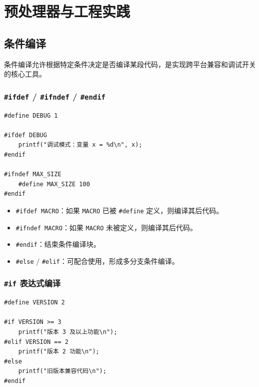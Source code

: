 \clearpage
\begingroup
\let\clearpage\relax
\let\cleardoublepage\relax
\vspace*{\fill}
\chapter{预处理器与工程实践}
\vspace*{\fill}
\endgroup
\clearpage


\section{条件编译}

条件编译允许根据特定条件决定是否编译某段代码，是实现跨平台兼容和调试开关的核心工具。

\subsection{\texorpdfstring{\texttt{\#ifdef} / \texttt{\#ifndef} / \texttt{\#endif}}{\#ifdef / \#ifndef / \#endif}}

\begin{lstlisting}[caption={条件编译基本用法}]
#define DEBUG 1

#ifdef DEBUG
    printf("调试模式：变量 x = %d\n", x);
#endif

#ifndef MAX_SIZE
    #define MAX_SIZE 100
#endif
\end{lstlisting}

\begin{itemize}
    \item \texttt{\#ifdef MACRO}：如果 \texttt{MACRO} 已被 \texttt{\#define} 定义，则编译其后代码。
    \item \texttt{\#ifndef MACRO}：如果 \texttt{MACRO} 未被定义，则编译其后代码。
    \item \texttt{\#endif}：结束条件编译块。
    \item \texttt{\#else} / \texttt{\#elif}：可配合使用，形成多分支条件编译。
\end{itemize}

\subsection{\texorpdfstring{\texttt{\#if} 表达式编译}{\#if 表达式编译}}

\begin{lstlisting}[caption={if 表达式条件编译}]
#define VERSION 2

#if VERSION >= 3
    printf("版本 3 及以上功能\n");
#elif VERSION == 2
    printf("版本 2 功能\n");
#else
    printf("旧版本兼容代码\n");
#endif
\end{lstlisting}

